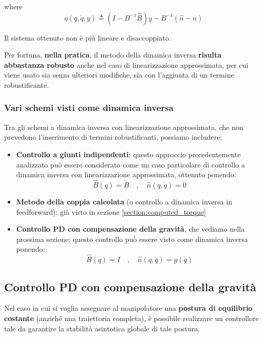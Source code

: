 where
$$
\eta(q, \dot{q}, y) \triangleq (I - B^{-1}\hat{B})y - B^{-1}(\hat{n} - n)
$$

Il sistema ottenuto non è più lineare e disaccoppiato.

Per fortuna, \textbf{nella pratica}, il metodo della dinamica inversa \textbf{risulta abbastanza robusto} anche nel caso di linearizzazione approssimata, per cui viene usato sia senza ulteriori modifiche, sia con l’aggiunta di un termine robustificante.\\

\vspace{10pt}
\subsubsection{Vari schemi visti come dinamica inversa}
Tra gli schemi a dinamica inversa con linearizzazione approssimata, che non prevedono l’inserimento di termini robustificanti, possiamo includere:
\begin{itemize}
	\item \textbf{Controllo a giunti indipendenti}: questo approccio precedentemente analizzato può essere considerato come un caso particolare di controllo a dinamica inversa con linearizzazione approssimata, ottenuto ponendo:
	$$
	\hat{B}(q) = \bar{B} \quad , \quad \hat{n}(q, \dot{q}) = 0
	$$
	\item \textbf{Metodo della coppia calcolata} (o controllo a dinamica inversa in feedforward): già visto in sezione \ref{section:computed_torque}
	\item \textbf{Controllo PD con compensazione della gravità}, che vediamo nella prossima sezione; questo controllo può essere visto come dinamica inversa ponendo:
	$$
	\hat{B}(q) = I \quad , \quad \hat{n}(q, \dot{q}) = g(q)
	$$
\end{itemize}
\unboldmath









\subsection{Controllo PD con compensazione della gravità}

Nel caso in cui si voglia assegnare al manipolatore una \textbf{postura di equilibrio costante} (anziché una traiettoria completa), è possibile realizzare un controllore tale da garantire la stabilità asintotica globale di tale postura.

